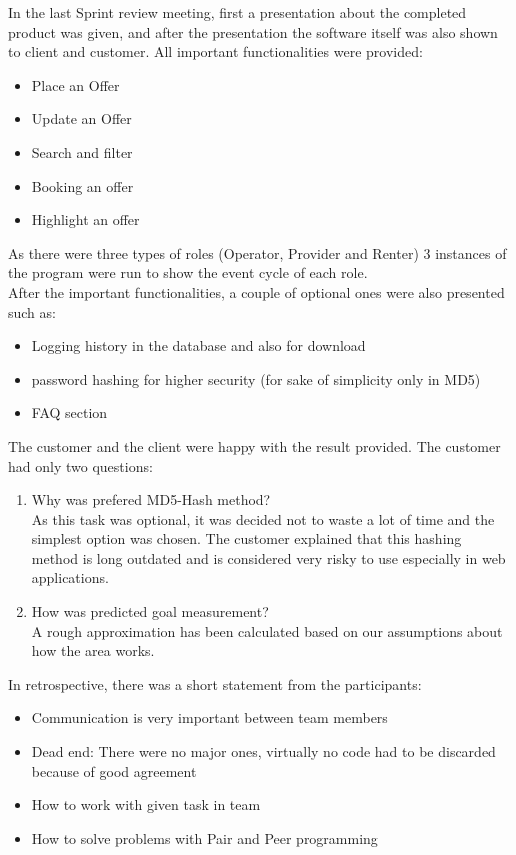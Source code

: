 In the last Sprint review meeting, first a presentation about the completed product was given, and after the presentation the software itself was also shown to client and customer. All important functionalities were provided:
\begin{itemize}
    \item Place an Offer
    \item Update an Offer
    \item Search and filter
    \item Booking an offer
    \item Highlight an offer
\end{itemize}


As there were three types of roles (Operator, Provider and Renter) 3 instances of the program were run to show the event cycle of each role.\\

After the important functionalities, a couple of optional ones were also presented such as:
\begin{itemize}
    \item Logging history in the database and also for download
    \item password hashing for higher security (for sake of simplicity only in MD5)
    \item FAQ section
\end{itemize}


The customer and the client were happy with the result provided. The customer had only two questions:

\begin{enumerate}
    \item Why was prefered MD5-Hash method?\\
    As this task was optional, it was decided not to waste a lot of time and the simplest option was chosen. The customer explained that this hashing method is long outdated and is considered very risky to use especially in web applications.
    \item How was predicted goal measurement?\\
    A rough approximation has been calculated based on our assumptions about how the area works.
\end{enumerate}

In retrospective, there was a short statement from the participants: 
\begin{itemize}
    \item Communication is very important between team members
    \item Dead end: There were no major ones, virtually no code had to be discarded because of good agreement
    \item How to work with given task in team
    \item How to solve problems with Pair and Peer programming
\end{itemize}